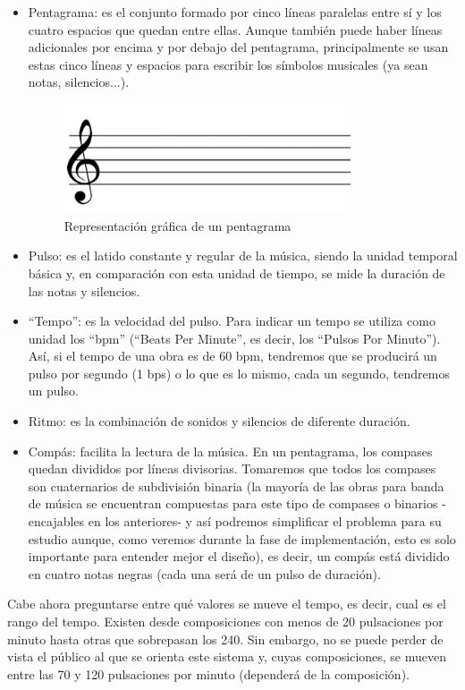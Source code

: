 \begin{itemize}
  \item Pentagrama: es el conjunto formado por cinco líneas paralelas entre sí y los cuatro espacios que quedan entre ellas.
  Aunque también puede haber líneas adicionales por encima y por debajo del pentagrama, principalmente se usan estas cinco
  líneas y espacios para escribir los símbolos musicales (ya sean notas, silencios...).
    \begin{figure}[htb]
    \centering
    \includegraphics[width=0.8\textwidth]{./imagenes/pentagrama}
    \caption{Representación gráfica de un pentagrama} \label{fig:pentagrama}
    \end{figure}
  \item Pulso: es el latido constante y regular de la música, siendo la unidad temporal básica y, en comparación con
  esta unidad de tiempo, se mide la duración de las notas y silencios.
  \item “Tempo”: es la velocidad del pulso. Para indicar un tempo se utiliza como unidad los “bpm”
    (“Beats Per Minute”, es decir, los “Pulsos Por Minuto”). Así, si el tempo de una obra es de 60 bpm,
    tendremos que se producirá un pulso por segundo (1 bps) o lo que es lo mismo, cada un segundo, tendremos un pulso.
  \item Ritmo: es la combinación de sonidos y silencios de diferente duración.
  \item Compás: facilita la lectura de la música. En un pentagrama, los compases quedan divididos por líneas divisorias.
    Tomaremos que todos los compases son cuaternarios de subdivisión binaria (la mayoría de las obras para banda de música se
    encuentran compuestas para este tipo de compases o binarios -encajables en los anteriores- y así podremos simplificar el
    problema para su estudio aunque, como veremos durante la fase de implementación, esto es solo importante para entender mejor
    el diseño), es decir, un compás está dividido en cuatro notas negras (cada una será de un pulso de duración).
  \end{itemize}

Cabe ahora preguntarse entre qué valores se mueve el tempo, es decir, cual es el rango
del tempo. Existen desde composiciones con menos de 20 pulsaciones por minuto hasta
otras que sobrepasan los 240. Sin embargo, no se puede perder de vista
el público al que se orienta este sistema y, cuyas composiciones, se mueven entre las 70 y 120 pulsaciones
por minuto (dependerá de la composición).\\

